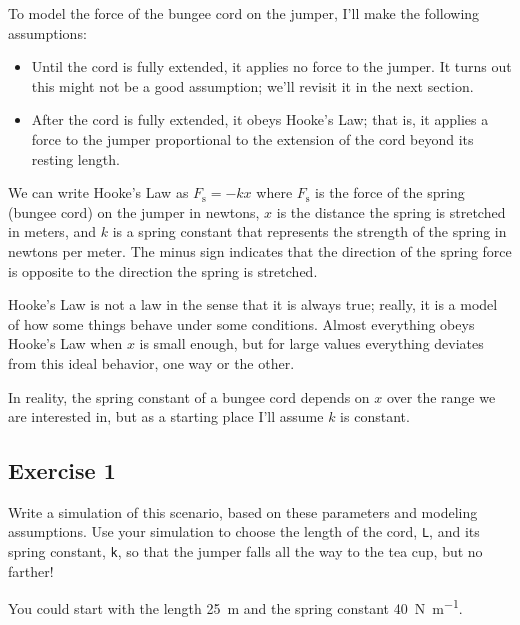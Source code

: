 To model the force of the bungee cord on the jumper, I'll make the following assumptions:

\begin{itemize}

\item Until the cord is fully extended, it applies no force to the jumper.  It turns out this might not be a good assumption; we'll revisit it in the next section.

\item After the cord is fully extended, it obeys Hooke's Law; that is, it applies a force to the jumper proportional to the extension of the cord beyond its resting length.

\end{itemize}

We can write Hooke's Law as
%
$F_\mathrm{s} = -k x$
%
where $F_\mathrm{s}$ is the force of the spring (bungee cord) on the jumper in newtons, $x$ is the distance the spring is stretched in meters, and $k$ is a spring constant that represents the strength of the spring in newtons per meter.
The minus sign indicates that the direction of the spring force is opposite to the direction the spring is stretched.


Hooke's Law is not \linebreak a law in the sense that it is always true; really, it is a model of how some things behave under some conditions.
Almost everything obeys Hooke's Law when $x$ is small enough, but for large values everything deviates from this ideal behavior, one way or the other.

In reality, the spring constant of a bungee cord depends on $x$ over the range we are interested in, but as a starting place I'll assume $k$ is constant.


\subsection{Exercise 1}

Write a simulation of this scenario, based on these parameters and modeling assumptions.
Use your simulation to choose the length of the cord, \lstinline{L}, and its spring constant, \lstinline{k}, so that the jumper falls all the way to the tea cup, but no farther!

You could start with the length \SI{25}{\meter} and the spring constant \SI{40}{\newton \per \meter}.


